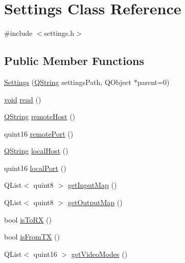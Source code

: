 \hypertarget{class_settings}{\section{\-Settings \-Class \-Reference}
\label{class_settings}
}


{\ttfamily \#include $<$settings.\-h$>$}

\subsection*{\-Public \-Member \-Functions}
\begin{DoxyCompactItemize}
\item 
\hyperlink{group___aero_sim_r_c_ga93af04323b9db4a809d0376a1ea6a7ae}{\-Settings} (\hyperlink{group___u_a_v_objects_plugin_gab9d252f49c333c94a72f97ce3105a32d}{\-Q\-String} settings\-Path, \-Q\-Object $\ast$parent=0)
\item 
\hyperlink{group___u_a_v_objects_plugin_ga444cf2ff3f0ecbe028adce838d373f5c}{void} \hyperlink{group___aero_sim_r_c_gac0f3ec889ab03b807e937580704a3ee9}{read} ()
\item 
\hyperlink{group___u_a_v_objects_plugin_gab9d252f49c333c94a72f97ce3105a32d}{\-Q\-String} \hyperlink{group___aero_sim_r_c_ga488c7f5a87b95d6b3e0b8d8c0647f984}{remote\-Host} ()
\item 
quint16 \hyperlink{group___aero_sim_r_c_gafd3c776de1db18a53414fc9ff7d5f656}{remote\-Port} ()
\item 
\hyperlink{group___u_a_v_objects_plugin_gab9d252f49c333c94a72f97ce3105a32d}{\-Q\-String} \hyperlink{group___aero_sim_r_c_gaf2ca84445d77cc2649ac0aa4958051f0}{local\-Host} ()
\item 
quint16 \hyperlink{group___aero_sim_r_c_gadb246f8a0f4976071e8e302b553df863}{local\-Port} ()
\item 
\-Q\-List$<$ quint8 $>$ \hyperlink{group___aero_sim_r_c_ga6607c28a72f6470cd410ac7baf8fba49}{get\-Input\-Map} ()
\item 
\-Q\-List$<$ quint8 $>$ \hyperlink{group___aero_sim_r_c_ga9c382b0fc01ca068ccf9f0226d707bc9}{get\-Output\-Map} ()
\item 
bool \hyperlink{group___aero_sim_r_c_ga80495f779a8152a0c16eed12fcfd69e4}{is\-To\-R\-X} ()
\item 
bool \hyperlink{group___aero_sim_r_c_gaa18f01bc8cd2c71856c0b13cc9fc3745}{is\-From\-T\-X} ()
\item 
\-Q\-List$<$ quint16 $>$ \hyperlink{group___aero_sim_r_c_ga885d740d0bc91afd8207ef878147e0d7}{get\-Video\-Modes} ()
\end{DoxyCompactItemize}



